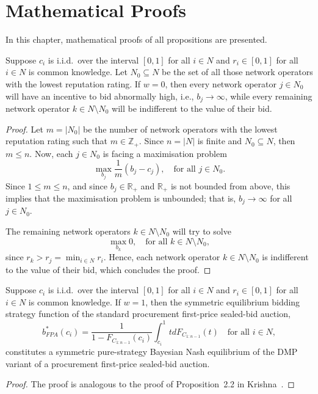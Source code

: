 \chapter{Mathematical Proofs} %
\label{cha:proofs}
In this chapter, mathematical proofs of all propositions are presented.

\begin{propositiona}[\ref{prop:special_case_w_0_direct}]
Suppose $c_i$ is i.i.d.~over the interval $[0,1]$ for all $i\in N$ and $r_i\in [0,1]$ for all $i\in N$ is common knowledge. Let $N_0\subseteq N$ be the set of all those network operators with the lowest reputation rating. If $w=0$, then every network operator $j\in N_0$ will have an incentive to bid abnormally high, i.e., $b_j\rightarrow\infty$, while every remaining network operator $k\in N\setminus N_0$ will be indifferent to the value of their bid.
\end{propositiona}
\begin{proof}
Let $m = |N_0|$ be the number of network operators with the lowest reputation rating such that $m\in\mathbb{Z}_+$. Since $n = |N|$ is finite and $N_0\subseteq N$, then $m \le n$. Now, each $j\in N_0$ is facing a maximisation problem
\begin{equation}
	\max_{b_j} \frac{1}{m} \left(b_j - c_j \right), \quad\text{for all } j\in N_0.
\end{equation}
Since $1\le m\le n$, and since $b_j\in\mathbb{R}_+$ and $\mathbb{R}_+$ is not bounded from above, this implies that the maximisation problem is unbounded; that is, $b_j\rightarrow\infty$ for all $j\in N_0$.

The remaining network operators $k\in N\setminus N_0$ will try to solve
\begin{equation}
	\max_{b_k} 0, \quad\text{for all } k\in N\setminus N_0,
\end{equation}
since $r_k > r_j = \min_{i\in N} r_i$. Hence, each network operator $k\in N\setminus N_0$ is indifferent to the value of their bid, which concludes the proof.
\end{proof}

\begin{propositiona}[\ref{prop:special_case_w_1_direct}]
Suppose $c_i$ is i.i.d.~over the interval $[0,1]$ for all $i\in N$ and $r_i \in [0,1]$ for all $i\in N$ is common knowledge. If $w=1$, then the symmetric equilibrium bidding strategy function of the standard procurement first-price sealed-bid auction,
\begin{equation}
	b^*_{FPA}(c_i) = \frac{1}{1 - F_{C_{1:n-1}}(c_i)}\int_{c_i}^{1} tdF_{C_{1:n-1}}(t) \quad\text{for all } i\in N,
\end{equation}
constitutes a symmetric pure-strategy Bayesian Nash equilibrium of the DMP variant of a procurement first-price sealed-bid auction.
\end{propositiona}
\begin{proof}
The proof is analogous to the proof of Proposition~2.2 in Krishna~\cite{Krishna10}.
\end{proof}

